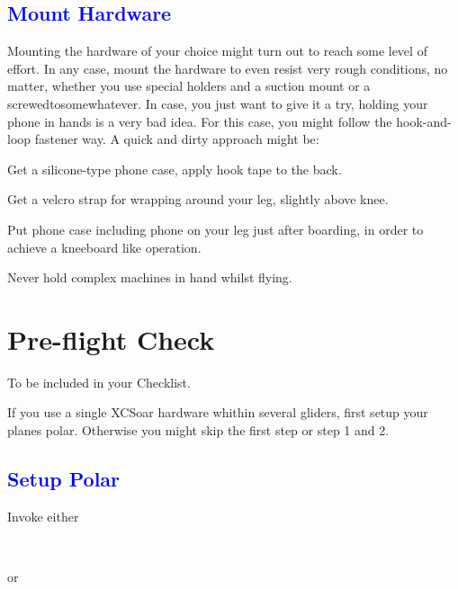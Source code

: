 \subsection*{\textcolor{blue}{Mount Hardware}}
Mounting the hardware of your choice might turn out to reach some level of 
effort.  In any case, mount the hardware to even resist very rough conditions, 
no matter, whether you use special holders and a suction mount or a 
screwedtosomewhatever.
In case, you just want to give it a try, holding your phone in hands is a very 
bad idea. For this case, you might follow the hook-and-loop fastener way. A 
quick and dirty approach might be:
\begin{compactitem}
\item Get a silicone-type phone case, apply hook tape to the back.
\item Get a velcro strap for wrapping around your leg, slightly above knee.
\item Put phone case including phone on your leg just after boarding, in order 
to achieve a kneeboard like operation.
\end{compactitem}
Never hold complex machines in hand whilst flying.

\newpage\section{Pre-flight Check}
To be included in your Checklist.

If you use a single XCSoar hardware whithin several gliders, first setup your 
planes polar. Otherwise you might skip the first step or step 1 and 2.

\subsection*{\textcolor{blue}{Setup Polar}}
Invoke either
\begin{flushleft}\hspace*{1cm}\sk\blink{}\\\end{flushleft}
or

